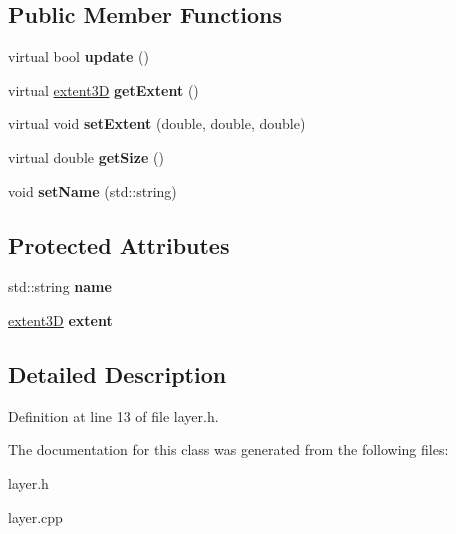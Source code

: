 \subsection*{Public Member Functions}
\begin{DoxyCompactItemize}
\item 
\mbox{\label{classlayer_ad153d45a8b34da24fa84f83dd828b960}} 
virtual bool {\bfseries update} ()
\item 
\mbox{\label{classlayer_a57de706157ab0ec174e0619e7829f6e9}} 
virtual \mbox{\hyperlink{classextent3D}{extent3D}} {\bfseries get\+Extent} ()
\item 
\mbox{\label{classlayer_a965efdddf4b7e7bd2344c24689eb48f9}} 
virtual void {\bfseries set\+Extent} (double, double, double)
\item 
\mbox{\label{classlayer_a0757a4ef63be3d92e5a22139533daaab}} 
virtual double {\bfseries get\+Size} ()
\item 
\mbox{\label{classlayer_a40931bf282a03bf88fc002954b496414}} 
void {\bfseries set\+Name} (std\+::string)
\end{DoxyCompactItemize}
\subsection*{Protected Attributes}
\begin{DoxyCompactItemize}
\item 
\mbox{\label{classlayer_a9233a262fa15466db3e2e1c2b422469a}} 
std\+::string {\bfseries name}
\item 
\mbox{\label{classlayer_ac80253765b74a00ad838fa3eb9c5724d}} 
\mbox{\hyperlink{classextent3D}{extent3D}} {\bfseries extent}
\end{DoxyCompactItemize}


\subsection{Detailed Description}


Definition at line 13 of file layer.\+h.



The documentation for this class was generated from the following files\+:\begin{DoxyCompactItemize}
\item 
layer.\+h\item 
layer.\+cpp\end{DoxyCompactItemize}
